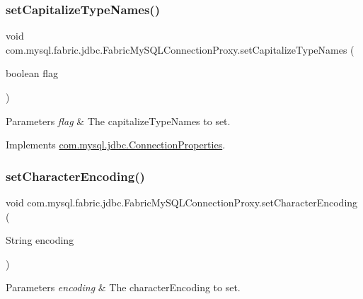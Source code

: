 \subsubsection{\texorpdfstring{set\+Capitalize\+Type\+Names()}{setCapitalizeTypeNames()}}
{\footnotesize\ttfamily void com.\+mysql.\+fabric.\+jdbc.\+Fabric\+My\+S\+Q\+L\+Connection\+Proxy.\+set\+Capitalize\+Type\+Names (\begin{DoxyParamCaption}\item[{boolean}]{flag }\end{DoxyParamCaption})}


\begin{DoxyParams}{Parameters}
{\em flag} & The capitalize\+Type\+Names to set. \\
\hline
\end{DoxyParams}


Implements \mbox{\hyperlink{interfacecom_1_1mysql_1_1jdbc_1_1_connection_properties_a4a5d21e7dfd9bedd2eb10f3169629288}{com.\+mysql.\+jdbc.\+Connection\+Properties}}.

\mbox{\label{classcom_1_1mysql_1_1fabric_1_1jdbc_1_1_fabric_my_s_q_l_connection_proxy_a37c25fb3919cf607240217459b1a19e3}} 
\subsubsection{\texorpdfstring{set\+Character\+Encoding()}{setCharacterEncoding()}}
{\footnotesize\ttfamily void com.\+mysql.\+fabric.\+jdbc.\+Fabric\+My\+S\+Q\+L\+Connection\+Proxy.\+set\+Character\+Encoding (\begin{DoxyParamCaption}\item[{String}]{encoding }\end{DoxyParamCaption})}


\begin{DoxyParams}{Parameters}
{\em encoding} & The character\+Encoding to set. \\
\hline
\end{DoxyParams}


